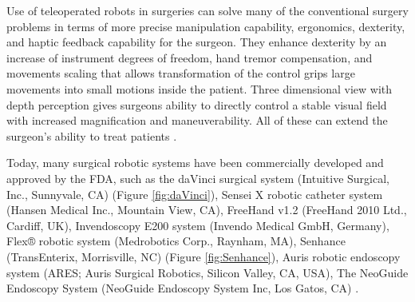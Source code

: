 

Use of teleoperated robots in surgeries can solve many of the conventional surgery problems in terms of more precise manipulation capability, ergonomics, dexterity, and haptic feedback capability for the surgeon. They enhance dexterity by an increase of instrument degrees of freedom, hand tremor compensation, and movements scaling that allows transformation of the control grips large movements into small motions inside the patient. Three dimensional view with depth perception gives surgeons ability to directly control a stable visual field with increased magnification and maneuverability. All of these can extend the surgeon's ability to treat patients \cite{tavakoli_haptics_2008}.

Today, many surgical robotic systems have been commercially developed and approved by the FDA, such as the daVinci surgical system (Intuitive Surgical, Inc., Sunnyvale, CA) (Figure \ref{fig:daVinci}), Sensei X robotic catheter system (Hansen Medical Inc., Mountain View, CA), FreeHand v1.2 (FreeHand 2010 Ltd., Cardiff, UK), Invendoscopy E200 system (Invendo Medical GmbH, Germany), Flex® robotic system (Medrobotics Corp., Raynham, MA), Senhance (TransEnterix, Morrisville, NC) (Figure \ref{fig:Senhance}), Auris robotic endoscopy system (ARES; Auris Surgical Robotics, Silicon Valley, CA, USA), The NeoGuide Endoscopy System (NeoGuide Endoscopy System Inc, Los Gatos, CA) \cite{lanfranco_robotic_2004,peters_review_2018}.

